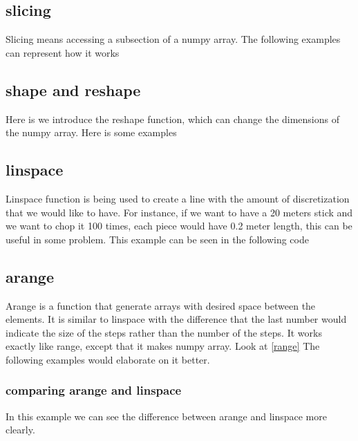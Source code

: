 \documentclass[10pt,a4paper]{article}
\begin{document}
\subsection{slicing}
Slicing means accessing a subsection of a numpy array.
The following examples can represent how it works



\subsection{shape and reshape}
Here is we introduce the reshape function, which can change the dimensions of the numpy array. Here is some examples



\subsection{linspace}
Linspace function is being used to create a line with the amount of discretization that we would like to have. For instance, if we want to have a 20 meters stick and we want to chop it 100 times, each piece would have 0.2 meter length, this can be useful in some problem. This example can be seen in the following code



\subsection{arange} \label{arange}
Arange is a function that generate arrays with desired space between the elements. It is similar to linspace with the difference that the last number would indicate the size of the steps rather than the number of the steps. It works exactly like range, except that it makes numpy array. Look at \ref{range} The following examples would elaborate on it better.



\subsubsection{comparing arange and linspace}
In this example we can see the difference between arange and linspace more clearly.

\end{document}
